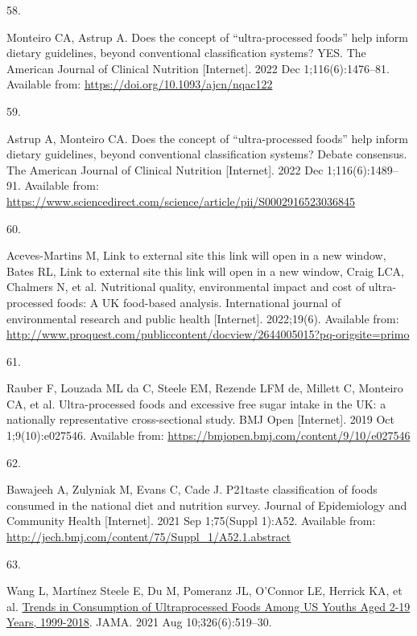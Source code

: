 \documentclass[
]{article}
\newlength{\cslhangindent}
\newlength{\csllabelwidth}
\newlength{\cslentryspacingunit} %
\newenvironment{CSLReferences}[2] %
 {%
  \setlength{\parindent}{0pt}
  \ifodd #1
  \let\oldpar\par
  \def\par{\hangindent=\cslhangindent\oldpar}
  \fi
  \setlength{\parskip}{#2\cslentryspacingunit}
 }%
 {}
\newcommand{\CSLLeftMargin}[1]{\parbox[t]{\csllabelwidth}{#1}}
\newcommand{\CSLRightInline}[1]{\parbox[t]{\linewidth - \csllabelwidth}{#1}\break}
\begin{document}
\begin{CSLReferences}{0}{0}
\leavevmode{}%
\CSLLeftMargin{58. }%
\CSLRightInline{Monteiro CA, Astrup A. Does the concept of
{``}ultra-processed foods{''} help inform dietary guidelines, beyond
conventional classification systems? YES. The American Journal of
Clinical Nutrition {[}Internet{]}. 2022 Dec 1;116(6):1476--81. Available
from: \url{https://doi.org/10.1093/ajcn/nqac122}}

\leavevmode{}%
\CSLLeftMargin{59. }%
\CSLRightInline{Astrup A, Monteiro CA. Does the concept of
{``}ultra-processed foods{''} help inform dietary guidelines, beyond
conventional classification systems? Debate consensus. The American
Journal of Clinical Nutrition {[}Internet{]}. 2022 Dec
1;116(6):1489--91. Available from:
\url{https://www.sciencedirect.com/science/article/pii/S0002916523036845}}

\leavevmode{}%
\CSLLeftMargin{60. }%
\CSLRightInline{Aceves-Martins M, Link to external site this link will
open in a new window, Bates RL, Link to external site this link will
open in a new window, Craig LCA, Chalmers N, et al. Nutritional quality,
environmental impact and cost of ultra-processed foods: A UK food-based
analysis. International journal of environmental research and public
health {[}Internet{]}. 2022;19(6). Available from:
\url{http://www.proquest.com/publiccontent/docview/2644005015?pq-origsite=primo}}

\leavevmode{}%
\CSLLeftMargin{61. }%
\CSLRightInline{Rauber F, Louzada ML da C, Steele EM, Rezende LFM de,
Millett C, Monteiro CA, et al. Ultra-processed foods and excessive free
sugar intake in the UK: a nationally representative cross-sectional
study. BMJ Open {[}Internet{]}. 2019 Oct 1;9(10):e027546. Available
from: \url{https://bmjopen.bmj.com/content/9/10/e027546}}

\leavevmode{}%
\CSLLeftMargin{62. }%
\CSLRightInline{Bawajeeh A, Zulyniak M, Evans C, Cade J.
P21{\hspace{0.25em}}taste classification of foods consumed in the
national diet and nutrition survey. Journal of Epidemiology and
Community Health {[}Internet{]}. 2021 Sep 1;75(Suppl 1):A52. Available
from: \url{http://jech.bmj.com/content/75/Suppl_1/A52.1.abstract}}

\leavevmode{}%
\CSLLeftMargin{63. }%
\CSLRightInline{Wang L, Martínez Steele E, Du M, Pomeranz JL, O'Connor
LE, Herrick KA, et al.
\href{https://doi.org/10.1001/jama.2021.10238}{Trends in Consumption of
Ultraprocessed Foods Among US Youths Aged 2-19 Years, 1999-2018}. JAMA.
2021 Aug 10;326(6):519--30. }


\end{CSLReferences}
\end{document}
